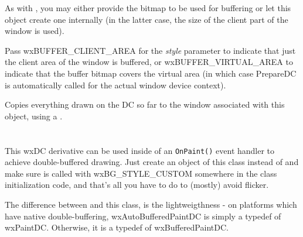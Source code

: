 \label{wxbufferedpaintdcctor}



As with , you may either provide the
bitmap to be used for buffering or let this object create one internally (in
the latter case, the size of the client part of the window is used).

Pass wxBUFFER\_CLIENT\_AREA for the {\it style} parameter to indicate that just the client area of
the window is buffered, or wxBUFFER\_VIRTUAL\_AREA to indicate that the buffer bitmap
covers the virtual area (in which case PrepareDC is automatically called for the actual window
device context).

\label{wxbufferedpaintdcdtor}

Copies everything drawn on the DC so far to the window associated with this
object, using a .



\section{}\label{wxautobufferedpaintdc}

This wxDC derivative can be used inside of an \texttt{OnPaint()} event handler to achieve
double-buffered drawing. Just create an object of this class instead of 
and make sure  is called
with wxBG\_STYLE\_CUSTOM somewhere in the class initialization code, and that's all you have
to do to (mostly) avoid flicker.

The difference between  and this class,
is the lightweigthness - on platforms which have native double-buffering, wxAutoBufferedPaintDC is simply
a typedef of wxPaintDC. Otherwise, it is a typedef of wxBufferedPaintDC.



\\
\\
\\

